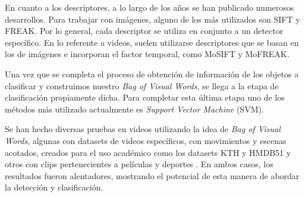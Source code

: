 En cuanto a los descriptores, a lo largo de los años se han publicado numerosos desarrollos. Para trabajar con imágenes, alguno de los más utilizados
son SIFT\parencite{lowe2004distinctive} y FREAK\parencite{alahi2012freak}. Por lo general, cada descriptor se utiliza en conjunto a un detector
específico. En lo referente a videos, suelen utilizarse descriptores que se basan en los de imágenes e incorporan el factor temporal,
como MoSIFT\parencite{chen2009mosift} y MoFREAK\parencite{whiten2013mofreak}.

Una vez que se completa el proceso de obtención de información de los objetos a clasificar y construimos nuestro \textit{Bag of Visual
Words}, se llega a la etapa de clasificación propiamente dicha. Para completar esta última etapa uno de los métodos más utilizado
actualmente es \textit{Support Vector Machine} (SVM).

Se han hecho diversas pruebas en videos utilizando la idea de \textit{Bag of Visual Words}, algunas con
datasets de videos específicos, con movimientos y escenas acotados, creados para el uso académico como los datasets KTH y HMDB51
\parencite{schuldt2004recognizing, kuehne2011hmdb, whiten2013mofreak} y otros con clips pertenecientes a películas y deportes
\parencite{chen2011violence, nievas2011violence, deniz2014fast}. En ambos casos, los resultados fueron alentadores, mostrando el
potencial de esta manera de abordar la detección y clasificación.